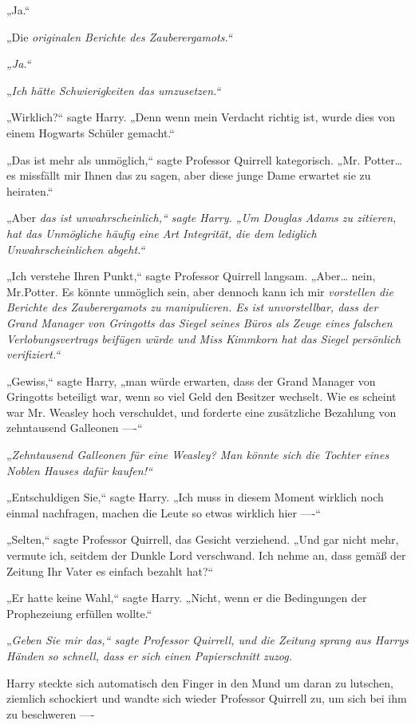 {„Ja.“

„Die \emph{originalen Berichte de\emph{s} \emph{Zauberergamots.“}}

\emph{„Ja.“}

„\emph{Ich hätte Schwierigkeiten das umzusetzen.“}

„Wirklich?“ sagte Harry. „Denn wenn mein Verdacht richtig ist, wurde dies von einem Hogwarts Schüler gemacht.“

„Das ist mehr als unmöglich,“ sagte Professor Quirrell kategorisch. „Mr. Potter… es missfällt mir Ihnen das zu sagen, aber diese junge Dame erwartet sie zu heiraten.“

„Aber \emph{das ist unwahrscheinlich,“ sagte Harry. „Um Douglas Adams zu zitieren, hat das Unmögliche häufig eine Art Integrität, die dem lediglich Unwahrscheinlichen abgeht.“}

„Ich verstehe Ihren Punkt,“ sagte Professor Quirrell langsam. „Aber… nein, Mr.Potter. Es könnte unmöglich sein, aber dennoch kann ich mir \emph{vorstellen die Berichte des Zauberergamots zu manipulieren. Es ist \emph{unvorstellbar,} dass der Grand Manager von Gringotts das Siegel seines Büros als Zeuge eines falschen Verlobungsvertrags beifügen würde und Miss Kimmkorn hat das Siegel persönlich verifiziert.“}

„Gewiss,“ sagte Harry, „man würde erwarten, dass der Grand Manager von Gringotts beteiligt war, wenn so viel Geld den Besitzer wechselt. Wie es scheint war Mr. Weasley hoch verschuldet, und forderte eine zusätzliche Bezahlung von zehntausend Galleonen ----“

„\emph{Zehntausend Galleonen für eine \emph{Weasley?} Man könnte sich die Tochter eines Noblen Hauses dafür kaufen!“}

„Entschuldigen Sie,“ sagte Harry. „Ich muss in diesem Moment wirklich noch einmal nachfragen, machen die Leute so etwas wirklich hier ----“

„Selten,“ sagte Professor Quirrell, das Gesicht verziehend. „Und gar nicht mehr, vermute ich, seitdem der Dunkle Lord verschwand. Ich nehme an, dass gemäß der Zeitung Ihr Vater es einfach bezahlt hat?“

„Er hatte keine Wahl,“ sagte Harry. „Nicht, wenn er die Bedingungen der Prophezeiung erfüllen wollte.“

„\emph{Geben Sie mir das,“ sagte Professor Quirrell, und die Zeitung sprang aus Harrys Händen so schnell, dass er sich einen Papierschnitt zuzog.}

Harry steckte sich automatisch den Finger in den Mund um daran zu lutschen, ziemlich schockiert und wandte sich wieder Professor Quirrell zu, um sich bei ihm zu beschweren ----

}
